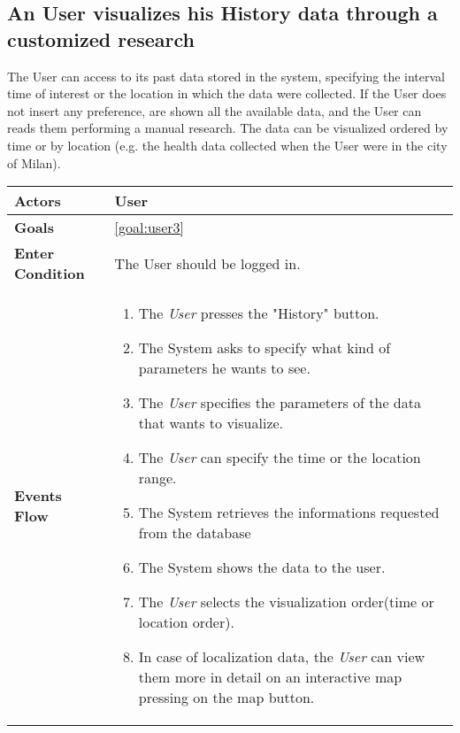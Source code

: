  \subsection{An User visualizes his History data through a customized research}
 
The User can access to its past data stored in the system, specifying the interval time of interest or the location in which the data were collected. If the User does not insert any preference, are shown all the available data, and the User can reads them performing a manual research.
The data can be visualized ordered by time or by location (e.g. the health data collected when the User were in the city of Milan).

\begin{table}[H]
	\centering
    
    \begin{tabular}{|p{3.5cm}|p{10.3cm}|}
    
    \hline
    
    \textbf{\large{Actors}}  			& \tabitem  User  				\\
    				 	
    \hline
    
    \textbf{\large{Goals}} 				&\ref{goal:user3}\\
    
     \hline
     
    \textbf{\large{Enter Condition}} & The User should be logged in.\\
    
    \hline
    \textbf{\large{Events Flow}}		& \begin{enumerate}[leftmargin=0.5cm]
                                          	\item The \emph{User}  presses the "History" button.
                                            \item The System asks to specify what kind of parameters he wants to see.
                                            \item The \emph{User} specifies the parameters of the data that wants to visualize.
                                            \item The \emph{User} can specify the time or the location range. 
                                            \item The System retrieves the informations requested from the database
                                            \item The System shows the data to the user.
                                            \item The \emph{User} selects the visualization order(time or location order).
                                            \item In case of localization data, the \emph{User} can view them more in detail on an interactive map pressing on the map button.            \end{enumerate}\\
                                            

\end{tabular}
\end{table}
